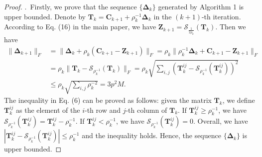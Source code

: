 \vspace{-6mm}
\begin{proof}
$ $.\ Firstly, we prove that the sequence $\{\bm{\Delta}_{k}\}$ generated by Algorithm 1 is upper bounded. Denote by $\bm{T}_{k}=\bm{C}_{k+1}+\rho_{k}^{-1}\bm{\Delta}_{k}$ in the $(k+1)$-th iteration. According to Eq. (16) in the main paper, we have $\bm{Z}_{k+1}=\mathcal{S}_{\frac{1}{2\rho_{k}}}(\bm{T}_{k})$. 
Then we have 
\begin{align}
\|
\bm{\Delta}_{k+1}
\|_{F}
&
=
\|
\bm{\Delta}_{k}
+
\rho_{k}
(\bm{C}_{k+1}-\bm{Z}_{k+1})
\|_{F}
=
\rho_{k}\|
\rho_{k}^{-1}
\bm{\Delta}_{k}
+
\bm{C}_{k+1}
-
\bm{Z}_{k+1}
\|_{F}
\\
&
=
\rho_{k}\|
\bm{T}_{k}
-
\mathcal{S}_{\rho_{k}^{-1}}(\bm{T}_{k})
\|_{F}
=
\rho_{k}
\sqrt{\sum_{i,j}(\bm{T}_{k}^{ij}-\mathcal{S}_{\rho_{k}^{-1}}(\bm{T}_{k}^{ij}))^{2}}
\\
&
\le
\rho_{k}
\sqrt{\sum_{i,j}\rho_{k}^{-2}}
=
3p^2M.
\end{align}
The inequality in Eq. (6) can be proved as follows: given the matrix $\bm{T}_{k}$, we define $\bm{T}_{k}^{ij}$ as the element of the $i$-th row and $j$-th column of $\bm{T}_{k}$. If $\bm{T}_{k}^{ij}\ge\rho_{k}^{-1}$, we have $\mathcal{S}_{\rho_{k}^{-1}}(\bm{T}_{k}^{ij})=\bm{T}_{k}^{ij}-\rho_{k}^{-1}$. If $\bm{T}_{k}^{ij}<\rho_{k}^{-1}$, we have $\mathcal{S}_{\rho_{k}^{-1}}(\bm{T}_{k}^{ij})=0$. Overall, we have $|\bm{T}_{k}^{ij}-\mathcal{S}_{\rho_{k}^{-1}}(\bm{T}_{k}^{ij})|\le\rho_{k}^{-1}$ and the inequality holds. Hence, the sequence $\{\bm{\Delta}_{k}\}$ is upper bounded.


\end{proof}
